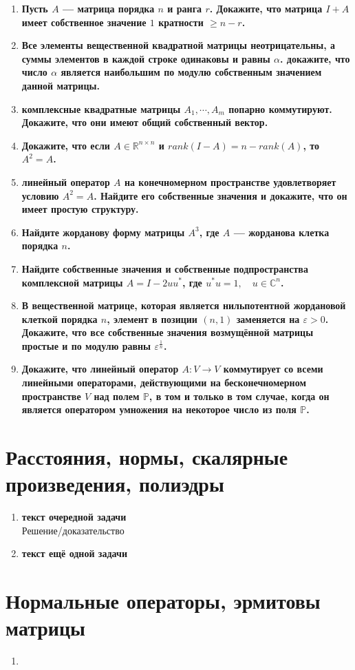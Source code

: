 \documentclass[12pt]{article} %
\begin{document}
\begin{enumerate}
    \item \textbf{Пусть $A$ --- матрица порядка $n$ и ранга $r$. Докажите, что матрица $I + A$ имеет собственное значение $1$ кратности $\geqslant n - r$.}
    \item \textbf{Все элементы вещественной квадратной матрицы неотрицательны, а суммы элементов в каждой строке одинаковы и равны $\alpha$. докажите, что число $\alpha$ является наибольшим по модулю собственным значением данной матрицы.}
    \item \textbf{комплексные квадратные матрицы $A_1, \cdots , A_m$ попарно коммутируют. Докажите, что они имеют общий собственный вектор.}
    \item \textbf{Докажите, что если $A \in \mathds{R}^{n \times n}$ и $rank(I - A) = n - rank(A)$, то $A^2 = A$.}
    \item \textbf{линейный оператор $A$ на конечномерном пространстве удовлетворяет условию $A^2 =A$. Найдите его собственные значения и докажите, что он имеет простую структуру.}
    \item \textbf{Найдите жорданову форму матрицы $A^3$, где $A$ --- жорданова клетка порядка $n$.}
    \item \textbf{Найдите собственные значения и собственные подпространства комплексной матрицы $A = I - 2uu^{*}$, где $u^{*}u = 1, \quad u \in \mathds{C}^n$.}
    \item \textbf{В вещественной матрице, которая является нильпотентной жордановой клеткой порядка $n$, элемент в позиции $(n, 1)$ заменяется на $\varepsilon > 0$. Докажите, что все собственные значения возмущённой матрицы простые и по модулю равны $\varepsilon^{\frac{1}{n}}$.}
    \item \textbf{Докажите, что линейный оператор $A: V \rightarrow V$ коммутирует со всеми линейными операторами, действующими на бесконечномерном пространстве $V$ над полем $\mathds{P}$, в том и только в том случае, когда он является оператором умножения на некоторое число из поля $\mathds{P}$.}
    
\end{enumerate}
\section{Расстояния, нормы, скалярные произведения, полиэдры}
\begin{enumerate}%
    \item \textbf{текст очередной задачи}\\

    Решение/доказательство
    \item \textbf{текст ещё одной задачи}%
\end{enumerate}
\section{Нормальные операторы, эрмитовы матрицы}
\begin{enumerate}
    \item 
\end{enumerate}

\end{document}

